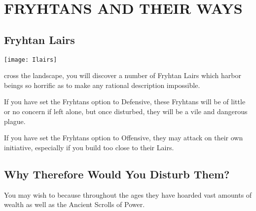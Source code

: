 
\chapter[Fryhtans and Their Ways]{\textsf{FRYHTANS AND THEIR WAYS}}

\section{\textsf{Fryhtan Lairs}}


\begin{center}
    \texttt{[image: Ilairs]} %
\end{center}

cross the landscape, you will discover a number of Fryhtan Lairs which harbor beings so horrific as to make any rational description impossible.

If you have set the Fryhtans option to Defensive, these Fryhtans will be of little or no concern if left alone, but once disturbed, they will be a vile and dangerous plague.

If you have set the Fryhtans option to Offensive, they may attack on their own initiative, especially if you build too close to their Lairs.

\section{\textsf{Why Therefore Would You Disturb Them?}}


You may wish to because throughout the ages they have hoarded vast amounts of wealth as well as the Ancient Scrolls of Power.

